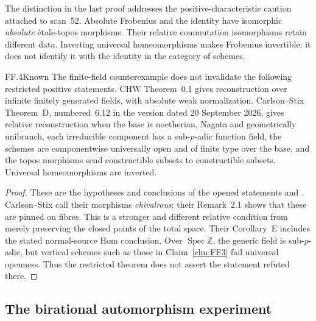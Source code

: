 The distinction in the last proof addresses the positive-characteristic
caution attached to scan~52. Absolute Frobenius and the identity have
isomorphic \emph{absolute} \'etale-topos morphisms. Their relative
commutation isomorphisms retain different data. Inverting universal
homeomorphisms makes Frobenius invertible; it does not identify it with
the identity in the category of schemes.

\begin{claim}{FF.4}{Known}\label{clm:FF4}
The finite-field counterexample does not invalidate the following
restricted positive statements. CHW Theorem~0.1 gives reconstruction
over infinite finitely generated fields, with absolute weak
normalization. Carlson--Stix Theorem~D, numbered~6.12 in the version
dated 20 September 2026, gives relative reconstruction when the base
is noetherian, Nagata and geometrically unibranch, each irreducible
component has a sub-\(p\)-adic function field, the schemes are
componentwise universally open and of finite type over the base,
and the topos morphisms send constructible subsets to constructible
subsets. Universal homeomorphisms are inverted.
\end{claim}
\begin{proof}
These are the hypotheses and conclusions of the opened statements
\citep[Theorem~0.1]{FF_CHW2024}
and \citep[Theorem~D, Theorem~6.12]{FF_CS2026}.
Carlson--Stix call their morphisms \emph{chivalrous}; their Remark~2.1
shows that these are pinned on fibres. This is a stronger and
different relative condition from merely preserving the closed
points of the total space. Their Corollary~E includes the stated
normal-source Hom conclusion. Over \(\operatorname{Spec}\mathbb Z\),
the generic field is sub-\(p\)-adic, but vertical schemes such as
those in Claim~\ref{clm:FF3} fail universal openness. Thus the
restricted theorem does not assert the statement refuted there.
\end{proof}

\subsection{The birational automorphism experiment}

